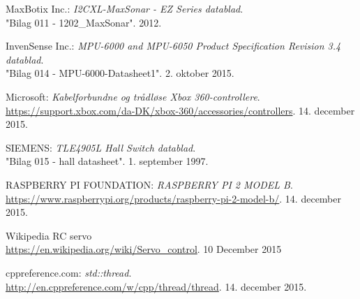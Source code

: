 \begin{thebibliography}{2}
 MaxBotix Inc.: \textit{I2CXL-MaxSonar - EZ Series datablad}. \\
"Bilag 011 - 1202\_MaxSonar". 2012.

 InvenSense Inc.: \textit{MPU-6000 and MPU-6050 Product Specification Revision 3.4 datablad}. \\
"Bilag 014 - MPU-6000-Datasheet1". 2. oktober 2015.

 Microsoft: \textit{Kabelforbundne og trådløse Xbox 360-controllere}. \\
\url{https://support.xbox.com/da-DK/xbox-360/accessories/controllers}. 14. december 2015.

 SIEMENS: \textit{TLE4905L Hall Switch datablad}. \\
"Bilag 015 - hall datasheet". 1. september 1997.

 RASPBERRY PI FOUNDATION: \textit{RASPBERRY PI 2 MODEL B}. \\
\url{https://www.raspberrypi.org/products/raspberry-pi-2-model-b/}. 14. december 2015.

 Wikipedia RC servo \\
\url{https://en.wikipedia.org/wiki/Servo_control}. 10 December 2015

 cppreference.com: \textit{std::thread}. \\
\url{http://en.cppreference.com/w/cpp/thread/thread}. 14. december 2015.

\end{thebibliography}